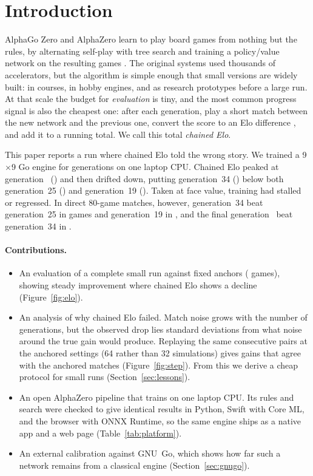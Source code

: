 \section{Introduction}
AlphaGo Zero and AlphaZero learn to play board games from nothing but the rules, by alternating self-play
with tree search and training a policy/value network on the resulting games
\citep{silver2017alphagozero,silver2018alphazero}.
The original systems used thousands of accelerators, but the algorithm is simple enough that small
versions are widely built: in courses, in hobby engines, and as research prototypes before a large run.
At that scale the budget for \emph{evaluation} is tiny, and the most common progress signal is also the
cheapest one: after each generation, play a short match between the new network and the previous one,
convert the score to an Elo difference \citep{elo1978rating}, and add it to a running total. We call this
total \emph{chained Elo}.

This paper reports a run where chained Elo told the wrong story. We trained a 9$\times$9 Go engine for
\valNGens{} generations on one laptop CPU. Chained Elo peaked at generation~\valChainedPeakGen{}
(\valChainedPeak{}) and then drifted down, putting generation~34 (\valChainedThirtyFour{}) below both
generation~25 (\valChainedTwentyFive{}) and generation~19 (\valChainedNineteen{}). Taken at face value,
training had stalled or regressed. In direct 80-game matches, however, generation~34 beat generation~25
in \valHTtfVsTf{} games and generation~19 in \valHTtfVsNt{}, and the final generation~\valNGens{} beat
generation~34 in \valHFfVsTtf{}.

\paragraph{Contributions.}
\begin{itemize}
  \item An evaluation of a complete small run against fixed anchors (\valHtoHGames{} games), showing steady
        improvement where chained Elo shows a decline (Figure~\ref{fig:elo}).
  \item An analysis of why chained Elo failed. Match noise grows with the number of generations, but the
        observed drop lies \valDropZ{} standard deviations from what noise around the true gain would produce. Replaying the same
        consecutive pairs at the anchored settings (64 rather than 32 simulations) gives gains that agree with
        the anchored matches (Figure~\ref{fig:step}). From this we derive a cheap protocol for small runs
        (Section~\ref{sec:lessons}).
  \item An open AlphaZero pipeline that trains on one laptop CPU. Its rules and search were checked to
        give identical results in Python, Swift with Core ML, and the browser with ONNX Runtime, so the
        same engine ships as a native app and a web page (Table~\ref{tab:platform}).
  \item An external calibration against GNU~Go, which shows how far such a network remains from a
        classical engine (Section~\ref{sec:gnugo}).
\end{itemize}
